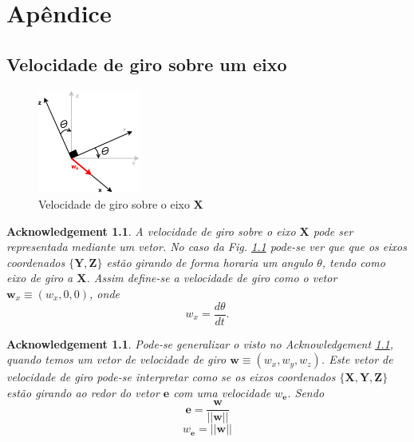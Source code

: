 \documentclass[a4paper,10pt]{report}
\newtheorem{acknowledgement}[theorem]{Acknowledgement}
\begin{document}
\chapter{Apêndice}


\section{Velocidade de giro sobre um eixo}


\begin{figure}[h!]
\centering
  \includegraphics[width=0.3\textwidth]{images/giro.eps} 
\caption{ Velocidade de giro sobre o eixo $\mathbf{X}$}
\label{fig:giro}
\end{figure}
\begin{acknowledgement}\label{acknow:girox}
 A velocidade de giro sobre o eixo $\mathbf{X}$ pode ser representada
 mediante um vetor. No caso da Fig. \ref{fig:giro} pode-se ver que 
 que os eixos coordenados $\{\mathbf{Y},\mathbf{Z}\}$ estão girando de forma horaria
 um angulo $\theta$, tendo como eixo de giro a $\mathbf{X}$.
 Assim define-se a velocidade de giro como o vetor $\mathbf{w}_x \equiv (w_x,0,0)$, onde
 \begin{equation}
  w_x=\frac{d \theta}{d t}.
 \end{equation}
\end{acknowledgement}

\begin{acknowledgement}\label{acknow:giro}
Pode-se generalizar o visto no  Acknowledgement \ref{acknow:girox}, quando temos
um vetor de velocidade de giro $\mathbf{w} \equiv (w_x,w_y,w_z)$.
Este vetor de velocidade de giro pode-se interpretar como se
os eixos coordenados $\{\mathbf{X},\mathbf{Y},\mathbf{Z}\}$ estão girando ao redor
do vetor $\mathbf{e}$ com uma velocidade $w_\mathbf{e}$. Sendo
\begin{equation}
 \mathbf{e}=\frac{\mathbf{w}}{||\mathbf{w}||}
\end{equation}
\begin{equation}
 w_\mathbf{e}=||\mathbf{w}||
\end{equation}

\end{acknowledgement}
\end{document}
